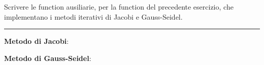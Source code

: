 Scrivere le function ausiliarie, per la function del precedente esercizio, che implementano i metodi
iterativi di Jacobi e Gauss-Seidel.

\hspace*{\fill}
\par\noindent\rule{\textwidth}{0.4pt}
\hspace*{\fill}

\textbf{Metodo di Jacobi}:

\textbf{Metodo di Gauss-Seidel}:


